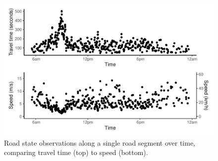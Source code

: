 \begin{knitrout}\small
{}\color{fgcolor}\begin{figure}

{\centering \includegraphics[width=0.8\linewidth]{figure/tt_figure-1} 

}

\caption[Road state observations along a single road segment.]{Road state observations along a single road segment over time, comparing travel time (top) to speed (bottom).}\label{fig:tt_figure}
\end{figure}


\end{knitrout}

